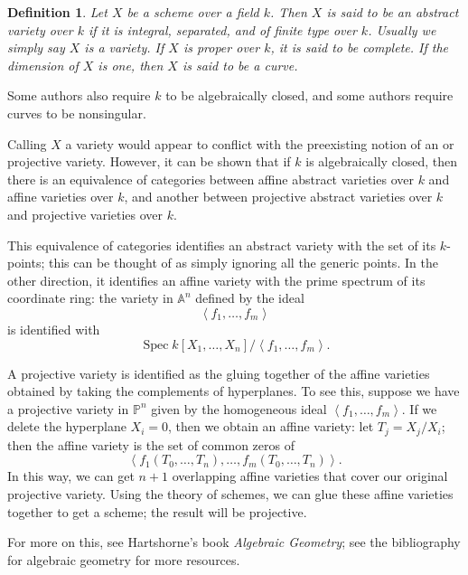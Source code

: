 \documentclass[12pt]{article}
\newtheorem{defn}{Definition}
\DeclareMathOperator{\Spec}{Spec}
\begin{document}
\begin{defn}
Let $X$ be a scheme over a field $k$.  Then $X$ is said to be an \emph{abstract variety} over $k$ if it is integral, separated, and of finite type over $k$.  Usually we simply say $X$ is a \emph{variety}.  If $X$ is proper over $k$, it is said to be \emph{complete}.  If the dimension of $X$ is one, then $X$ is said to be a \emph{curve}.
\end{defn}
Some authors also require $k$ to be algebraically closed, and some authors require curves to be nonsingular.  

Calling $X$ a variety would appear to conflict with the preexisting notion of an  or projective variety.  However, it can be shown that if $k$ is algebraically closed, then there is an equivalence of categories between affine abstract varieties over $k$ and affine varieties over $k$, and another between projective abstract varieties over $k$ and projective varieties over $k$. 

This equivalence of categories identifies an abstract variety with the set of its $k$-points; this can be thought of as simply ignoring all the generic points.  In the other direction, it identifies an affine variety with the prime spectrum of its coordinate ring: the variety in $\mathbb{A}^n$ defined by the ideal 
\[
\left<f_1,\ldots,f_m\right>
\]
is identified with
\[
\Spec k[X_1,\ldots,X_n]/\left<f_1,\ldots,f_m\right>.
\]

A projective variety is identified as the gluing together of the affine varieties obtained by taking the complements of hyperplanes.  To see this, suppose we have a projective variety in $\mathbb{P}^n$ given by the homogeneous ideal $\left<f_1,\ldots,f_m\right>$.  If we delete the hyperplane $X_i=0$, then we obtain an affine variety: let $T_j = X_j/X_i$; then the affine variety is the set of common zeros of 
\[
\left<f_1(T_0,\ldots,T_n),\ldots,f_m(T_0,\ldots,T_n)\right>.
\]
In this way, we can get $n+1$ overlapping affine varieties that cover our original projective variety. Using the theory of schemes, we can glue these affine varieties together to get a scheme; the result will be projective. 

For more on this, see Hartshorne's book \emph{Algebraic Geometry}; see the bibliography for algebraic geometry for more resources.
\end{document}
